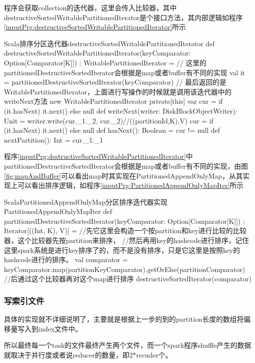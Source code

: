 程序会获取collection的迭代器，这里会传入比较器，其中destructiveSortedWritablePartitionedIterator是个接口方法，其内部逻辑如程序\ref{inputPrg:destructiveSortedWritablePartitionedIterator}所示
\begin{codeInput}{Scala}{排序分区迭代器}{destructiveSortedWritablePartitionedIterator}
def destructiveSortedWritablePartitionedIterator(keyComparator: Option[Comparator[K]])
: WritablePartitionedIterator = {
  // 这里的partitionedDestructiveSortedIterator会根据是map或者buffer有不同的实现
  val it = partitionedDestructiveSortedIterator(keyComparator)
  // 最后返回的是WritablePartitionedIterator，上面进行写操作的时候就是调用该迭代器中的writeNext方法
  new WritablePartitionedIterator {
    private[this] var cur = if (it.hasNext) it.next() else null	
    def writeNext(writer: DiskBlockObjectWriter): Unit = {
      writer.write(cur._1._2, cur._2)//((partitionId,K),V)
      cur = if (it.hasNext) it.next() else null
    }	
    def hasNext(): Boolean = cur != null	
    def nextPartition(): Int = cur._1._1
  }
}
\end{codeInput}

程序\ref{inputPrg:destructiveSortedWritablePartitionedIterator}中partitionedDestructiveSortedIterator会根据是map或者buffer有不同的实现，由图\ref{fig:mapAndBuffer}可以看出map时其实现在PartitionedAppendOnlyMap，从其实现上可以看出排序逻辑，如程序\ref{inputPrg:PartitionedAppendOnlyMapIter}所示
\begin{codeInput}{Scala}{PartitionedAppendOnlyMap分区排序迭代器实现}{PartitionedAppendOnlyMapIter}
def partitionedDestructiveSortedIterator(keyComparator: Option[Comparator[K]])
: Iterator[((Int, K), V)] = {
  //先它这里会构造一个按partition和key进行比较的比较器，这个比较器先按partition来排序，
  //然后再用key的hashcode进行排序，记住这里spark系统是进行key排序了的，而不是没有排序，只是它这里是按照key的hashcode进行的排序。
  val comparator = keyComparator.map(partitionKeyComparator).getOrElse(partitionComparator)
  //后通过这个比较器再对这个map进行排序
  destructiveSortedIterator(comparator)
}
\end{codeInput}
\subsubsection{写索引文件}
具体的实现就不详细说明了，主要就是根据上一步的到的partition长度的数组将偏移量写入到index文件中。

所以最终每一个task的文件最终产生两个文件，而一个spark程序shuffle产生的数据就取决于并行度或者说reducer的数量，即2*recuder个。

